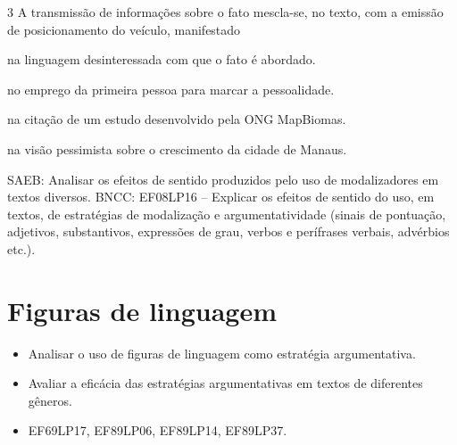 \num{3} A transmissão de informações sobre o fato mescla-se, no texto,
com a emissão de posicionamento do veículo, manifestado

\begin{escolha}
\item na linguagem desinteressada com que o fato é abordado.

\item no emprego da primeira pessoa para marcar a pessoalidade.

\item na citação de um estudo desenvolvido pela ONG MapBiomas.

\item na visão pessimista sobre o crescimento da cidade de Manaus.
\end{escolha}

SAEB: Analisar os efeitos de sentido produzidos pelo uso de
modalizadores em textos diversos. BNCC: EF08LP16 -- Explicar os efeitos
de sentido do uso, em textos, de estratégias de modalização e
argumentatividade (sinais de pontuação, adjetivos, substantivos,
expressões de grau, verbos e perífrases verbais, advérbios etc.).

\chapter{Figuras de linguagem}


\begin{itemize}
\tightlist
\item
  Analisar o uso de figuras de linguagem como estratégia argumentativa.
\item
  Avaliar a eficácia das estratégias argumentativas em textos de
  diferentes gêneros.
\end{itemize}


\begin{itemize}
\tightlist
\item
  EF69LP17, EF89LP06, EF89LP14, EF89LP37.
\end{itemize}


